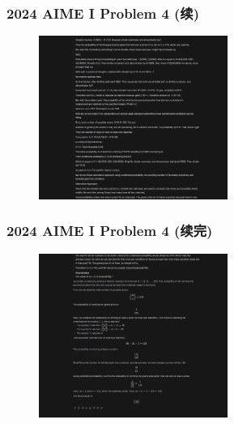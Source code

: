 \begin{frame}
    \frametitle{2024 AIME I Problem 4 (续)}
    \begin{figure}
        \centering
        \includegraphics[width=0.55\textwidth]{./pic/5.png} %
        \label{fig:aime_solution_3}
    \end{figure}
\end{frame}

\begin{frame}
    \frametitle{2024 AIME I Problem 4 (续完)}
    \begin{figure}
        \centering
        \includegraphics[width=0.55\textwidth]{./pic/6.png} %
        \label{fig:aime_solution_4}
    \end{figure}
\end{frame}

